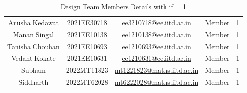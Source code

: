\documentclass[12pt]{article} %
\begin{document}
\begin{table}[h!]
\begin{tabular}{|c|c|c|c|c|}
Anusha Kedawat & 2021EE30718 & \href{mailto:ee3210718@ee.iitd.ac.in}{ee3210718@ee.iitd.ac.in} & Member & 1 \\
Manan Singal & 2021EE10138 & \href{mailto:ee1210138@ee.iitd.ac.in}{ee1210138@ee.iitd.ac.in} & Member & 1 \\
Tanisha Chouhan & 2021EE10693 & \href{mailto:ee1210693@ee.iitd.ac.in}{ee1210693@ee.iitd.ac.in} & Member & 1 \\
Vedant Kokate & 2021EE10631 & \href{mailto:ee1210631@ee.iitd.ac.in}{ee1210631@ee.iitd.ac.in} & Member & 1 \\
Subham & 2022MT11823 & \href{mailto:mt1221823@maths.iitd.ac.in}{mt1221823@maths.iitd.ac.in} & Member & 1 \\
Siddharth  & 2022MT62028 & \href{mailto:mt6222028@maths.iitd.ac.in}{mt6222028@maths.iitd.ac.in} & Member & 1 \\
\hline
\end{tabular}
\caption{Design Team Members Details with \acrshort{if} = 1}
\label{tab:teamDetails}
\end{table}
\end{document}
